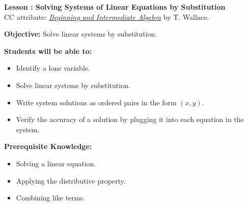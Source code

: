 \documentclass[12pt]{article}
\theoremstyle{definition}
\begin{document}
{\bf \large Lesson : Solving Systems of Linear Equations by Substitution}\\
CC attribute: \href{http://www.wallace.ccfaculty.org/book/book.html}{\it{Beginning and Intermediate Algebra}} by T. Wallace. \hfill \doclicenseImage[imagewidth=5em]\\
\par
{\bf Objective:} Solve linear systems by substitution.\\
\par
{\bf Students will be able to:}
\begin{itemize}
	\item Identify a lone variable.
	\item Solve linear systems by substitution.
	\item Write system solutions as ordered pairs in the form $(x,y)$.
	\item Verify the accuracy of a solution by plugging it into each equation in the system.
\end{itemize}
{\bf Prerequisite Knowledge:}
\begin{itemize}
	\item Solving a linear equation.
	\item Applying the distributive property.
	\item Combining like terms.
\end{itemize}
\hrulefill
\end{document}

